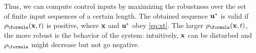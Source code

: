 Thus, we can compute control inputs by maximizing the robustness over the set of finite input sequences of a certain length.
The obtained sequence $\mathbf{u}^*$ is valid if $\robf(\sstraj,t)$ is positive, where $\mathbf{x}$ and $\mathbf{u}^*$ obey \eqref{eq:xt}.
The larger $\robf(\sstraj,t)$, the more robust is the behavior of the system: intuitively, $\mathbf{x}$ can be disturbed and $\robf$ might decrease but not go negative.
